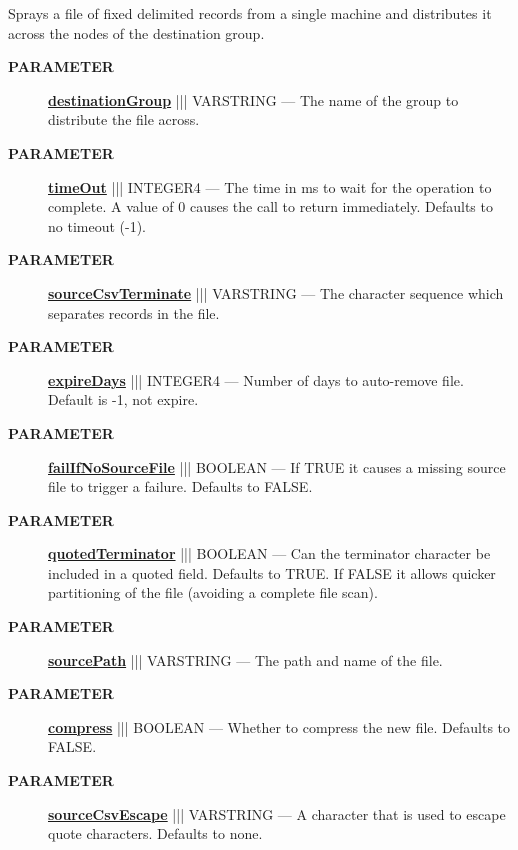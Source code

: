 \par





Sprays a file of fixed delimited records from a single machine and distributes it across the nodes of the destination group.






\par
\begin{description}
\item [\colorbox{tagtype}{\color{white} \textbf{\textsf{PARAMETER}}}] \textbf{\underline{destinationGroup}} ||| VARSTRING --- The name of the group to distribute the file across.
\item [\colorbox{tagtype}{\color{white} \textbf{\textsf{PARAMETER}}}] \textbf{\underline{timeOut}} ||| INTEGER4 --- The time in ms to wait for the operation to complete. A value of 0 causes the call to return immediately. Defaults to no timeout (-1).
\item [\colorbox{tagtype}{\color{white} \textbf{\textsf{PARAMETER}}}] \textbf{\underline{sourceCsvTerminate}} ||| VARSTRING --- The character sequence which separates records in the file.
\item [\colorbox{tagtype}{\color{white} \textbf{\textsf{PARAMETER}}}] \textbf{\underline{expireDays}} ||| INTEGER4 --- Number of days to auto-remove file. Default is -1, not expire.
\item [\colorbox{tagtype}{\color{white} \textbf{\textsf{PARAMETER}}}] \textbf{\underline{failIfNoSourceFile}} ||| BOOLEAN --- If TRUE it causes a missing source file to trigger a failure. Defaults to FALSE.
\item [\colorbox{tagtype}{\color{white} \textbf{\textsf{PARAMETER}}}] \textbf{\underline{quotedTerminator}} ||| BOOLEAN --- Can the terminator character be included in a quoted field. Defaults to TRUE. If FALSE it allows quicker partitioning of the file (avoiding a complete file scan).
\item [\colorbox{tagtype}{\color{white} \textbf{\textsf{PARAMETER}}}] \textbf{\underline{sourcePath}} ||| VARSTRING --- The path and name of the file.
\item [\colorbox{tagtype}{\color{white} \textbf{\textsf{PARAMETER}}}] \textbf{\underline{compress}} ||| BOOLEAN --- Whether to compress the new file. Defaults to FALSE.
\item [\colorbox{tagtype}{\color{white} \textbf{\textsf{PARAMETER}}}] \textbf{\underline{sourceCsvEscape}} ||| VARSTRING --- A character that is used to escape quote characters. Defaults to none.

\end{description}
